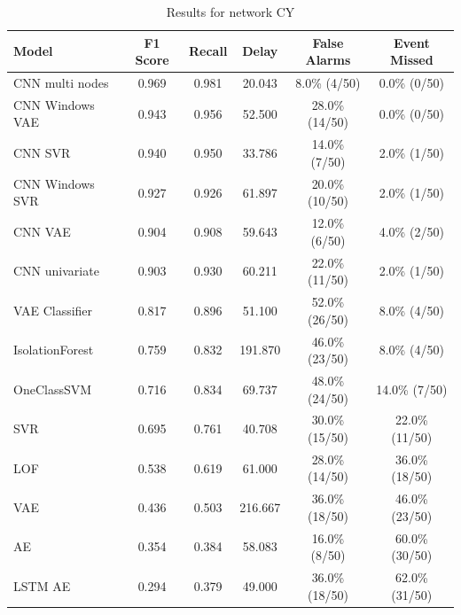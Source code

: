 \begin{table}
\caption{Results for network CY}
\label{tab:results-CY}
\begin{tabular}{lccccc}
\toprule
Model & F1 Score & Recall & Delay & False Alarms & Event Missed \\
\midrule
CNN multi nodes & 0.969 & 0.981 & 20.043 & 8.0\% (4/50) & 0.0\% (0/50) \\
CNN Windows VAE & 0.943 & 0.956 & 52.500 & 28.0\% (14/50) & 0.0\% (0/50) \\
CNN SVR & 0.940 & 0.950 & 33.786 & 14.0\% (7/50) & 2.0\% (1/50) \\
CNN Windows SVR & 0.927 & 0.926 & 61.897 & 20.0\% (10/50) & 2.0\% (1/50) \\
CNN VAE & 0.904 & 0.908 & 59.643 & 12.0\% (6/50) & 4.0\% (2/50) \\
CNN univariate & 0.903 & 0.930 & 60.211 & 22.0\% (11/50) & 2.0\% (1/50) \\
VAE Classifier & 0.817 & 0.896 & 51.100 & 52.0\% (26/50) & 8.0\% (4/50) \\
IsolationForest & 0.759 & 0.832 & 191.870 & 46.0\% (23/50) & 8.0\% (4/50) \\
OneClassSVM & 0.716 & 0.834 & 69.737 & 48.0\% (24/50) & 14.0\% (7/50) \\
SVR & 0.695 & 0.761 & 40.708 & 30.0\% (15/50) & 22.0\% (11/50) \\
LOF & 0.538 & 0.619 & 61.000 & 28.0\% (14/50) & 36.0\% (18/50) \\
VAE & 0.436 & 0.503 & 216.667 & 36.0\% (18/50) & 46.0\% (23/50) \\
AE & 0.354 & 0.384 & 58.083 & 16.0\% (8/50) & 60.0\% (30/50) \\
LSTM AE & 0.294 & 0.379 & 49.000 & 36.0\% (18/50) & 62.0\% (31/50) \\
\bottomrule
\end{tabular}
\end{table}
